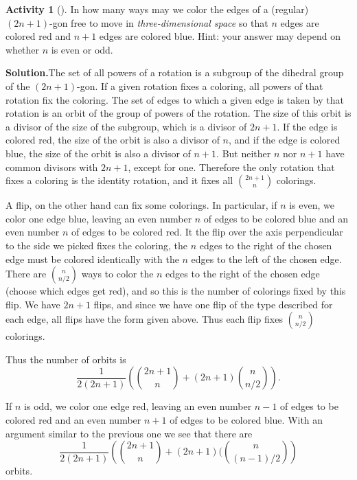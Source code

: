 \documentclass[10pt,]{book}
\theoremstyle{plain}
\theoremstyle{definition}
\newtheorem{activity}[project]{Activity}
\numberwithin{equation}{chapter}
\begin{document}
\begin{activity}[]\label{activity-315}
In how many ways may we color the edges of a (regular) \((2n+1)\)-gon free to move in \emph{three-dimensional space} so that \(n\) edges are colored red and \(n+1\) edges are colored blue. Hint: your answer may depend on whether \(n\) is even or odd.%
\par\medskip\noindent%
\textbf{Solution.}\quad The set of all powers of a rotation is a subgroup of the dihedral group of the \((2n+1)\)-gon. If a given rotation fixes a coloring, all powers of that rotation fix the coloring. The set of edges to which a given edge is taken by that rotation is an orbit of the group of powers of the rotation. The size of this orbit is a divisor of the size of the subgroup, which is a divisor of \(2n+1\). If the edge is colored red, the size of the orbit is also a divisor of \(n\), and if the edge is colored blue, the size of the orbit is also a divisor of \(n+1\). But neither \(n\) nor \(n+1\) have common divisors with \(2n+1\), except for one. Therefore the only rotation that fixes a coloring is the identity rotation, and it fixes all \(\binom{2n+1}{n}\) colorings.%
\par
A flip, on the other hand can fix some colorings. In particular, if \(n\) is even, we color one edge blue, leaving an even number \(n\) of edges to be colored blue and an even number \(n\) of edges to be colored red. It the flip over the axis perpendicular to the side we picked fixes the coloring, the \(n\) edges to the right of the chosen edge must be colored identically with the \(n\) edges to the left of the chosen edge. There are \(\binom{n}{n/2}\) ways to color the \(n\) edges to the right of the chosen edge (choose which edges get red), and so this is the number of colorings fixed by this flip. We have \(2n+1\) flips, and since we have one flip of the type described for each edge, all flips have the form given above. Thus each flip fixes \(\binom{n}{n/2}\) colorings.%
\par
Thus the number of orbits is%
\begin{equation*}
\frac{1}{2(2n+1)}\left(\binom{2n+1}{n} +
(2n+1)\binom{n}{n/2}\right).
\end{equation*}
%
\par
If \(n\) is odd, we color one edge red, leaving an even number \(n-1\) of edges to be colored red and an even number \(n+1\) of edges to be colored blue. With an argument similar to the previous one we see that there are%
\begin{equation*}
\frac{1}{2(2n+1)}\left(\binom{2n+1}{n} + (2n+1)(\binom{n}{(n-1)/2}\right)
\end{equation*}
orbits.%
\end{activity}
\end{document}
